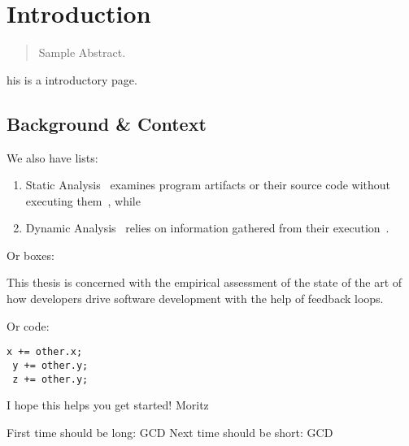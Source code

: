 \chapter{Introduction}
\label{introduction}

\begin{abstract}
Sample Abstract.
\end{abstract}



\newpage

his is a introductory page.

\section{Background \& Context}


We also have lists:

\begin{enumerate}
  \item Static Analysis~ examines program artifacts or
    their source code without executing them~\cite{wichmann1995industrial}, while
 \item Dynamic Analysis~ relies on information gathered from their
   execution~\cite{cornelissen2009systematic}.
\end{enumerate}

Or boxes:

\begin{framed}
This thesis is concerned with the empirical assessment of the state of the art of how developers
drive software development with the help of feedback loops. \cite{boyer2020dynamics}
\end{framed}

Or code:
\begin{lstlisting}[caption={\textsc{TrinityCore}},label={lst:e1}]
 x += other.x;
 y += other.y;
 z += other.y;
\end{lstlisting}


I hope this helps you get started!
Moritz

First time should be long: \gls{GCD}
Next time should be short: \gls{GCD}
